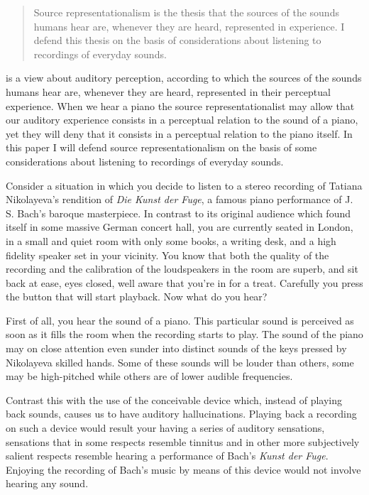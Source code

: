 \documentclass[sloppy, journal, git, bytitle, dodraft]{humapap}
\begin{document}
\documenttitle

\begin{abstract}
Source representationalism is the thesis that the sources of the sounds humans hear are, whenever they are heard, represented in experience. I defend this thesis on the basis of considerations about listening to recordings of everyday sounds. 
\end{abstract}	

 is a view about auditory perception, according to which the sources of the sounds humans hear are, whenever they are heard, represented in their perceptual experience. When we hear a piano the source representationalist may allow that our auditory experience consists in a perceptual relation to the sound of a piano, yet they will deny that it consists in a perceptual relation to the piano itself. In this paper I will defend source representationalism on the basis of some considerations about listening to recordings of everyday sounds.

\sect Consider a situation in which you decide to listen to a stereo recording of Tatiana Nikolayeva's rendition of \emph{Die Kunst der Fuge}, a famous piano performance of J. S. Bach's baroque masterpiece. In contrast to its original audience which found itself in some massive German concert hall, you are currently seated in London, in a small and quiet room with only some books, a writing desk, and a high fidelity speaker set in your vicinity. You know that both the quality of the recording and the calibration of the loudspeakers in the room are superb, and sit back at ease, eyes closed, well aware that you're in for a treat. Carefully you press the button that will start playback. Now what do you hear? 

\sect First of all, you hear the sound of a piano. This particular sound is perceived as soon as it fills the room when the recording starts to play. The sound of the piano may on close attention even sunder into distinct sounds of the keys pressed by Nikolayeva skilled hands. Some of these sounds will be louder than others, some may be high-pitched while others are  of lower audible frequencies.

Contrast this with the use of the conceivable device which, instead of playing back sounds, causes us to have auditory hallucinations. Playing back a recording on such a device would result your having a series of auditory sensations, sensations that in some respects resemble tinnitus and in other more subjectively salient respects resemble hearing a performance of Bach's \emph{Kunst der Fuge}. Enjoying the recording of Bach's music by means of this device would not involve hearing any sound. 
\end{document}
